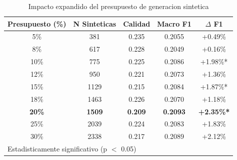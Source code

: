 
\begin{table}[h]
\centering
\caption{Impacto expandido del presupuesto de generacion sintetica}
\label{tab:budget_validation_expanded}
\begin{tabular}{ccccc}
\hline
Presupuesto (\%) & N Sinteticas & Calidad & Macro F1 & $\Delta$ F1 \\
\hline
5\% & 381 & 0.235 & 0.2055 & +0.49\% \\
8\% & 617 & 0.228 & 0.2049 & +0.16\% \\
10\% & 775 & 0.225 & 0.2086 & +1.98\%* \\
12\% & 950 & 0.221 & 0.2073 & +1.36\% \\
15\% & 1129 & 0.215 & 0.2084 & +1.87\%* \\
18\% & 1463 & 0.226 & 0.2070 & +1.18\% \\
\textbf{20\%} & \textbf{1509} & \textbf{0.209} & \textbf{0.2093} & \textbf{+2.35\%*} \\
25\% & 2039 & 0.224 & 0.2083 & +1.83\% \\
30\% & 2338 & 0.217 & 0.2089 & +2.12\% \\

\hline
\multicolumn{5}{l}{\footnotesize *Estadisticamente significativo (p $<$ 0.05)} \\
\end{tabular}
\end{table}
